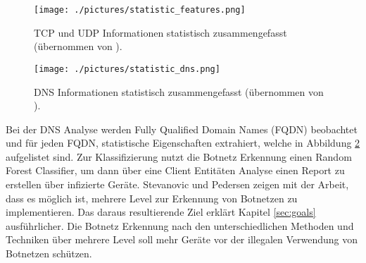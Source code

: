 \begin{figure}[h!]
    \centering
    \texttt{[image: ./pictures/statistic\_features.png]}
    \caption{TCP und UDP Informationen statistisch zusammengefasst (übernommen von \cite{DBLP:journals/ijcysa/StevanovicP16}).}
    \label{fig:stats_features}
\end{figure}

\begin{figure}[h!]
    \centering
    \texttt{[image: ./pictures/statistic\_dns.png]}
    \caption{DNS Informationen statistisch zusammengefasst (übernommen von \cite{DBLP:journals/ijcysa/StevanovicP16}).}
    \label{fig:stats_dns}
\end{figure}

Bei der DNS Analyse werden Fully Qualified Domain Names (FQDN) beobachtet und für jeden FQDN, statistische Eigenschaften extrahiert, welche in Abbildung \ref{fig:stats_dns} aufgelistet sind. Zur 
Klassifizierung nutzt die Botnetz Erkennung einen Random Forest Classifier, um dann über eine Client Entitäten Analyse einen Report zu erstellen über infizierte Geräte. Stevanovic und Pedersen 
zeigen mit der Arbeit, dass es möglich ist, mehrere Level zur Erkennung von Botnetzen zu implementieren. Das daraus resultierende Ziel erklärt Kapitel \ref{sec:goals} ausführlicher.
Die Botnetz Erkennung nach den unterschiedlichen Methoden und Techniken über mehrere Level soll mehr Geräte vor der illegalen Verwendung von Botnetzen schützen. 

